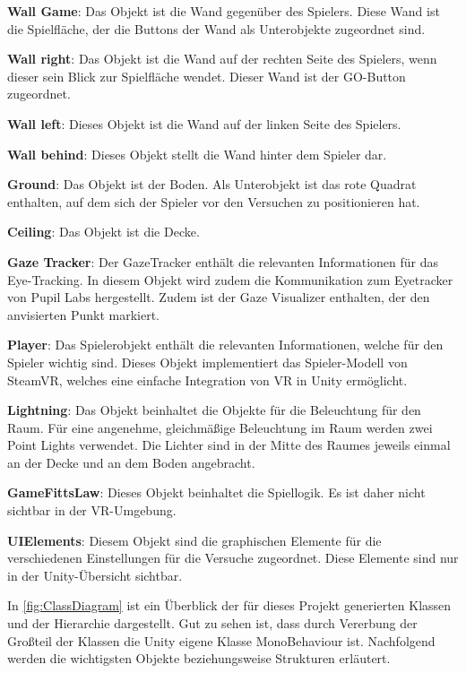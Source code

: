 \begin{description}
	\item \textbf{Wall Game}: Das Objekt ist die Wand gegenüber des Spielers. Diese Wand ist die Spielfläche, der die Buttons der Wand als Unterobjekte zugeordnet sind.
	\item \textbf{Wall right}: Das Objekt ist die Wand auf der rechten Seite des Spielers, wenn dieser sein Blick zur Spielfläche wendet. Dieser Wand ist der GO-Button zugeordnet.
	\item \textbf{Wall left}: Dieses Objekt ist die Wand auf der linken Seite des Spielers.
	\item \textbf{Wall behind}: Dieses Objekt stellt die Wand hinter dem Spieler dar.
	\item \textbf{Ground}: Das Objekt ist der Boden. Als Unterobjekt ist das rote Quadrat enthalten, auf dem sich der Spieler vor den Versuchen zu positionieren hat.
	\item \textbf{Ceiling}: Das Objekt ist die Decke.
	\item \textbf{Gaze Tracker}: Der GazeTracker enthält die relevanten Informationen für das Eye-Tracking. In diesem Objekt wird zudem die Kommunikation zum Eyetracker von Pupil Labs hergestellt. Zudem ist der Gaze Visualizer enthalten, der den anvisierten Punkt markiert.
	\item \textbf{Player}: Das Spielerobjekt enthält die relevanten Informationen, welche für den Spieler wichtig sind. Dieses Objekt implementiert das Spieler-Modell von SteamVR, welches eine einfache Integration von VR in Unity ermöglicht.
	\item \textbf{Lightning}: Das Objekt beinhaltet die Objekte für die Beleuchtung für den Raum. Für eine angenehme, gleichmäßige Beleuchtung im Raum werden zwei Point Lights verwendet. Die Lichter sind in der Mitte des Raumes jeweils einmal an der Decke und an dem Boden angebracht. 
	\item \textbf{GameFittsLaw}: Dieses Objekt beinhaltet die Spiellogik. Es ist daher nicht sichtbar in der \ac{VR}-Umgebung.
	\item \textbf{UIElements}: Diesem Objekt sind die graphischen Elemente für die verschiedenen Einstellungen für die Versuche zugeordnet. Diese Elemente sind nur in der Unity-Übersicht sichtbar. 
\end{description}

In \autoref{fig:ClassDiagram} ist ein Überblick der für dieses Projekt generierten Klassen und der Hierarchie dargestellt. Gut zu sehen ist, dass durch Vererbung der Großteil der Klassen die Unity eigene Klasse MonoBehaviour ist. Nachfolgend werden die wichtigsten Objekte beziehungsweise Strukturen erläutert. 

